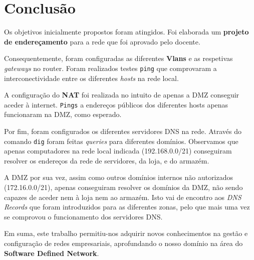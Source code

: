 \chapter{Conclusão} \label{conclusion}

Os objetivos inicialmente propostos foram atingidos.
Foi elaborada um \textbf{projeto de endereçamento} para a rede que foi aprovado pelo docente.

Consequentemente, foram configuradas as diferentes \textbf{Vlans} e as respetivas \textit{gateways} no router.
Foram realizados testes \verb|ping| que comprovaram a interconectividade entre os diferentes \textit{hosts} na rede local.

A configuração do \textbf{NAT} foi realizada no intuito de apenas a DMZ conseguir aceder à internet.
\verb|Pings| a endereços públicos dos diferentes hosts apenas funcionaram na DMZ, como esperado.

Por fim, foram configurados os diferentes servidores DNS na rede.
Através do comando \verb|dig| foram feitas \textit{queries} para diferentes domínios.
Observamos que apenas computadores na rede local indicada (192.168.0.0/21) conseguiram resolver os endereços da rede de servidores, da loja, e do armazém.

A DMZ por sua vez, assim como outros domínios internos não autorizados (172.16.0.0/21), apenas conseguiram resolver os domínios da DMZ, não sendo capazes de aceder nem à loja nem ao armazém.
Isto vai de encontro aos \textit{DNS Records} que foram introduzidos para as diferentes zonas, pelo que mais uma vez se comprovou o funcionamento dos servidores DNS.

Em suma, este trabalho permitiu-nos adquirir novos conhecimentos na gestão e configuração de redes empresariais, aprofundando o nosso domínio na área do \textbf{Software Defined Network}.
